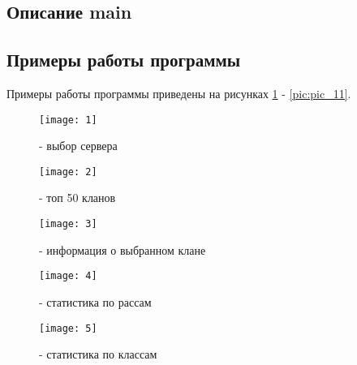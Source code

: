 \newpage

\subsection{Описание main}


\parindent=1cm

\newpage

\subsection{Примеры работы программы}

Примеры работы программы приведены на рисунках \ref{pic:pic_2} - \ref{pic:pic_11}.

\begin{figure}[H]
	\begin{center}
		\texttt{[image: 1]}
		\caption{- выбор сервера} 
		\label{pic:pic_2} %
	\end{center}
\end{figure}

\begin{figure}[H]
	\begin{center}
		\texttt{[image: 2]}
		\caption{- топ 50 кланов} 
		\label{pic:pic_3} %
	\end{center}
\end{figure}

\begin{figure}[H]
	\begin{center}
		\texttt{[image: 3]}
		\caption{- информация о выбранном клане} 
		\label{pic:pic_4} %
	\end{center}
\end{figure}

\begin{figure}[H]
	\begin{center}
		\texttt{[image: 4]}
		\caption{- статистика по рассам} 
		\label{pic:pic_5} %
	\end{center}
\end{figure}

\begin{figure}[H]
	\begin{center}
		\texttt{[image: 5]}
		\caption{- статистика по классам} 
		\label{pic:pic_6} %
	\end{center}
\end{figure}

